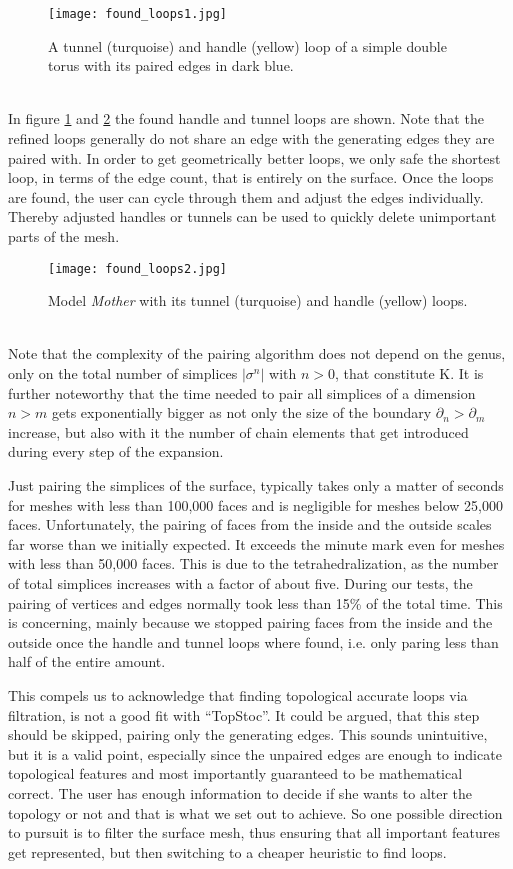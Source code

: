 \begin{figure}[ht]
\centering
\texttt{[image: found\_loops1.jpg]}
\caption{A tunnel (turquoise) and handle (yellow) loop of a simple double torus with its paired edges in dark blue.}
\label{fig:found_loops1}
\end{figure}\\
In figure \ref{fig:found_loops1} and \ref{fig:found_loops2} the found handle and tunnel loops are shown.
Note that the refined loops generally do not share an edge with the generating edges they are paired with.
In order to get geometrically better loops, we only safe the shortest loop, in terms of the edge count, that is entirely on the surface.
Once the loops are found, the user can cycle through them and adjust the edges individually.
Thereby adjusted handles or tunnels can be used to quickly delete unimportant parts of the mesh.
\begin{figure}[ht]
\centering
\texttt{[image: found\_loops2.jpg]}
\caption{Model \textit{Mother} with its tunnel (turquoise) and handle (yellow) loops.}
\label{fig:found_loops2}
\end{figure}\\
Note that the complexity of the pairing algorithm does not depend on the genus, only on the total number of simplices $|\sigma^{n}|$ with $n>0$, that constitute $\mathrm{K}$.
It is further noteworthy that the time needed to pair all simplices of a dimension $n>m$ gets exponentially bigger as not only the size of the boundary $\partial_{n} > \partial_{m}$ increase, but also with it the number of chain elements that get introduced during every step of the expansion.

Just pairing the simplices of the surface, typically takes only a matter of seconds for meshes with less than 100,000 faces and is negligible for meshes below 25,000 faces.
Unfortunately, the pairing of faces from the inside and the outside scales far worse than we initially expected.
It exceeds the minute mark even for meshes with less than 50,000 faces.
This is due to the tetrahedralization, as the number of total simplices increases with a factor of about five.
During our tests, the pairing of vertices and edges normally took less than 15\% of the total time.
This is concerning, mainly because we stopped pairing faces from the inside and the outside once the handle and tunnel loops where found, i.e. only paring less than half of the entire amount.

This compels us to acknowledge that finding topological accurate loops via filtration, is not a good fit with ``TopStoc''.
It could be argued, that this step should be skipped, pairing only the generating edges.
This sounds unintuitive, but it is a valid point, especially since the unpaired edges are enough to indicate topological features and most importantly guaranteed to be mathematical correct.
The user has enough information to decide if she wants to alter the topology or not and that is what we set out to achieve.
So one possible direction to pursuit is to filter the surface mesh, thus ensuring that all important features get represented, but then switching to a cheaper heuristic to find loops.

